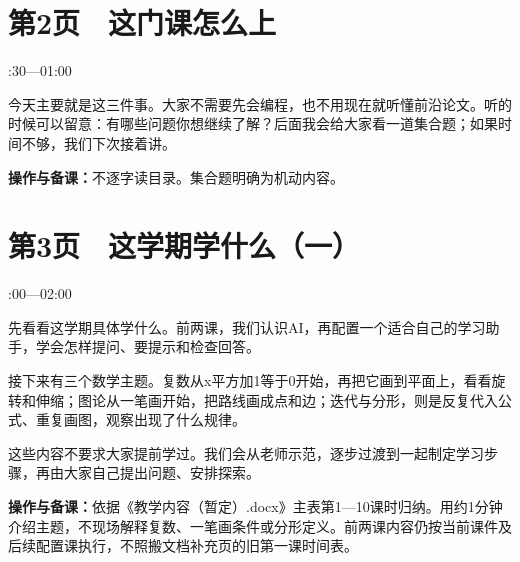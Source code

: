 \documentclass[UTF8,a4paper,11pt,fontset=fandol]{ctexart}
\newcommand{\tip}[1]{\par{\small\color{black!65}\noindent\textbf{操作与备课：}#1\par}}
\begin{document}
\par\noindent\begin{minipage}{\linewidth}

\section*{第2页　这门课怎么上}

{\small{}:30—01:00\par}

今天主要就是这三件事。大家不需要先会编程，也不用现在就听懂前沿论文。听的时候可以留意：有哪些问题你想继续了解？后面我会给大家看一道集合题；如果时间不够，我们下次接着讲。

\tip{不逐字读目录。集合题明确为机动内容。}

\end{minipage}\par\vspace{2mm}

\par\noindent\begin{minipage}{\linewidth}

\section*{第3页　这学期学什么（一）}

{\small{}:00—02:00\par}

先看看这学期具体学什么。前两课，我们认识AI，再配置一个适合自己的学习助手，学会怎样提问、要提示和检查回答。

接下来有三个数学主题。复数从x平方加1等于0开始，再把它画到平面上，看看旋转和伸缩；图论从一笔画开始，把路线画成点和边；迭代与分形，则是反复代入公式、重复画图，观察出现了什么规律。

这些内容不要求大家提前学过。我们会从老师示范，逐步过渡到一起制定学习步骤，再由大家自己提出问题、安排探索。

\tip{依据《教学内容（暂定）.docx》主表第1—10课时归纳。用约1分钟介绍主题，不现场解释复数、一笔画条件或分形定义。前两课内容仍按当前课件及后续配置课执行，不照搬文档补充页的旧第一课时间表。}

\end{minipage}\par\vspace{2mm}
\end{document}
